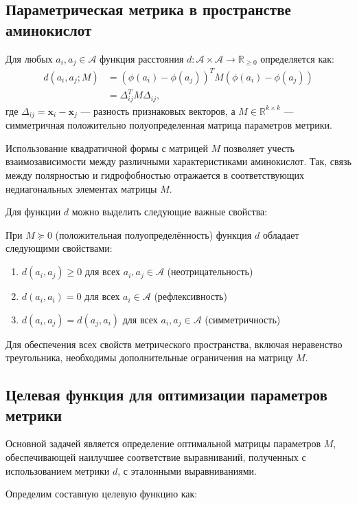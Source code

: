 \documentclass[12pt]{article}
\begin{document}
\subsection{Параметрическая метрика в пространстве аминокислот}

Для любых $a_i, a_j \in \mathcal{A}$ функция расстояния $d: \mathcal{A} \times \mathcal{A} \to \mathbb{R}_{\geq 0}$ определяется как:
\begin{align}
d(a_i, a_j; M) &= (\phi(a_i) - \phi(a_j))^T M (\phi(a_i) - \phi(a_j)) \\
&= \Delta_{ij}^T M \Delta_{ij},
\end{align}
где $\Delta_{ij} = \mathbf{x}_i - \mathbf{x}_j$ — разность признаковых векторов, а $M \in \mathbb{R}^{k \times k}$ — симметричная положительно полуопределенная матрица параметров метрики.

Использование квадратичной формы с матрицей $M$ позволяет учесть взаимозависимости между различными характеристиками аминокислот. Так, связь между полярностью и гидрофобностью отражается в соответствующих недиагональных элементах матрицы $M$.

Для функции $d$ можно выделить следующие важные свойства:

При $M \succeq 0$ (положительная полуопределённость) функция $d$ обладает следующими свойствами:
\begin{enumerate}
\item $d(a_i, a_j) \geq 0$ для всех $a_i, a_j \in \mathcal{A}$ (неотрицательность)
\item $d(a_i, a_i) = 0$ для всех $a_i \in \mathcal{A}$ (рефлексивность)
\item $d(a_i, a_j) = d(a_j, a_i)$ для всех $a_i, a_j \in \mathcal{A}$ (симметричность)
\end{enumerate}

Для обеспечения всех свойств метрического пространства, включая неравенство треугольника, необходимы дополнительные ограничения на матрицу $M$.

\subsection{Целевая функция для оптимизации параметров метрики}

Основной задачей является определение оптимальной матрицы параметров $M$, обеспечивающей наилучшее соответствие выравниваний, полученных с использованием метрики $d$, с эталонными выравниваниями.

Определим составную целевую функцию как:
\end{document}

